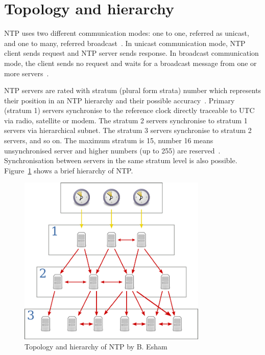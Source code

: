 
\section{Topology and hierarchy}\label{sec:ntp-topology}
NTP uses two different communication modes:
one to one, referred as unicast, and one to many, referred broadcast~\cite{rfc5905}.
In unicast communication mode, NTP client sends request and NTP server sends response.
In broadcast communication mode, the client sends no request
and waits for a broadcast message from one or more servers~\cite{rfc5905}.

NTP servers are rated with stratum (plural form strata) number which represents their position
in an NTP hierarchy and their possible accuracy~\cite{rfc5905}.
Primary (stratum 1) servers synchronise to the reference clock directly traceable to UTC via
radio, satellite or modem.
The stratum 2 servers synchronise to stratum 1
servers via hierarchical subnet.
The stratum 3 servers synchronise to stratum 2 servers, and so on.
The maximum stratum is 15, number 16 means unsynchronised server
and higher numbers (up to 255) are reserved~\cite{rfc5905}.
Synchronisation between servers in the same stratum level is also possible.
Figure~\ref{fig:ntp-hierarchy} shows a brief hierarchy of NTP.
\begin{figure}
  \centering
  \includegraphics[width=9cm,keepaspectratio]{fig/Network_Time_Protocol_servers_and_clients.pdf}
  \caption{Topology and hierarchy of NTP by B. Esham}
  \label{fig:ntp-hierarchy}
  \bigskip
\end{figure}
